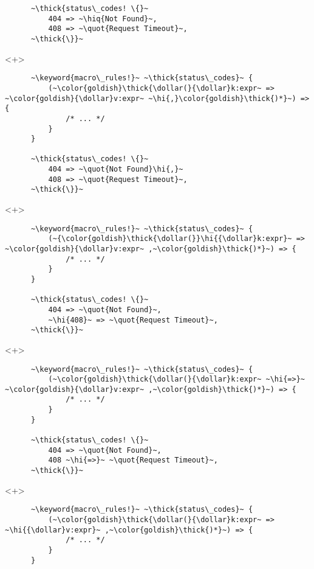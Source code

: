 \documentclass[usepdftitle=false,aspectratio=169]{beamer}
\newcommand{\dollar}{\makebox[\widthof{\$}][c]{\$}}
\newcommand{\thick}[1]{\contourlength{0.16pt}\contour[10]{black}{#1}}
\newcommand{\slantbox}[2][.5]
  {%
    \mbox
      {%
        \sbox{\foobox}{#2}%
        \hskip\wd\foobox
        \pdfsave
        \pdfsetmatrix{1 0 #1 1}%
        \llap{\usebox{\foobox}}%
        \pdfrestore
      }%
  }
\newcommand{\backslantbox}[2][.5]
  {%
    \mbox
      {%
        \sbox{\foobox}{#2}%
        \hskip\wd\foobox
        \pdfsave
        \pdfsetmatrix{-1 0 #1 1}%
        \llap{\usebox{\foobox}}%
        \pdfrestore
      }%
  }
\newcommand{\hi}[1]{%
\tikz[baseline=(A.base)]
 \node[highlighting=yellowbg,inner sep=0pt,text depth=0pt] (A) {#1};%
}
\newcommand{\openquote}{\backslantbox[.2]{\hspace{11pt}''\hspace{-11pt}}}
\newcommand{\closequote}{\slantbox[-.2]{\hspace{2pt}''\hspace{-2pt}}}
\newcommand{\hiq}[1]{\hi{\openquote#1\closequote}}
\newcommand{\blackquote}[1]{\openquote#1\closequote}
\newcommand{\quot}[1]{{\color{redish}\blackquote{#1}}}
\newcommand{\keyword}[1]{\color{greenish}#1}
\begin{document}
\begin{frame}[fragile]
\begin{onlyenv}
\begin{verbatim}
      ~\thick{status\_codes! \{}~
          404 => ~\hiq{Not Found}~,
          408 => ~\quot{Request Timeout}~,
      ~\thick{\}}~
    \end{verbatim}
  \end{onlyenv}
  \begin{onlyenv}<+>
    \begin{verbatim}
      ~\keyword{macro\_rules!}~ ~\thick{status\_codes}~ {
          (~\color{goldish}\thick{\dollar(}{\dollar}k:expr~ => ~\color{goldish}{\dollar}v:expr~ ~\hi{,}\color{goldish}\thick{)*}~) => {
              /* ... */
          }
      }

      ~\thick{status\_codes! \{}~
          404 => ~\quot{Not Found}\hi{,}~
          408 => ~\quot{Request Timeout}~,
      ~\thick{\}}~
    \end{verbatim}
  \end{onlyenv}
  \begin{onlyenv}<+>
    \begin{verbatim}
      ~\keyword{macro\_rules!}~ ~\thick{status\_codes}~ {
          (~{\color{goldish}\thick{\dollar(}}\hi{{\dollar}k:expr}~ => ~\color{goldish}{\dollar}v:expr~ ,~\color{goldish}\thick{)*}~) => {
              /* ... */
          }
      }

      ~\thick{status\_codes! \{}~
          404 => ~\quot{Not Found}~,
          ~\hi{408}~ => ~\quot{Request Timeout}~,
      ~\thick{\}}~
    \end{verbatim}
  \end{onlyenv}
  \begin{onlyenv}<+>
    \begin{verbatim}
      ~\keyword{macro\_rules!}~ ~\thick{status\_codes}~ {
          (~\color{goldish}\thick{\dollar(}{\dollar}k:expr~ ~\hi{=>}~ ~\color{goldish}{\dollar}v:expr~ ,~\color{goldish}\thick{)*}~) => {
              /* ... */
          }
      }

      ~\thick{status\_codes! \{}~
          404 => ~\quot{Not Found}~,
          408 ~\hi{=>}~ ~\quot{Request Timeout}~,
      ~\thick{\}}~
    \end{verbatim}
  \end{onlyenv}
  \begin{onlyenv}<+>
    \begin{verbatim}
      ~\keyword{macro\_rules!}~ ~\thick{status\_codes}~ {
          (~\color{goldish}\thick{\dollar(}{\dollar}k:expr~ => ~\hi{{\dollar}v:expr}~ ,~\color{goldish}\thick{)*}~) => {
              /* ... */
          }
      }


\end{verbatim}
\end{onlyenv}
\end{frame}
\end{document}
